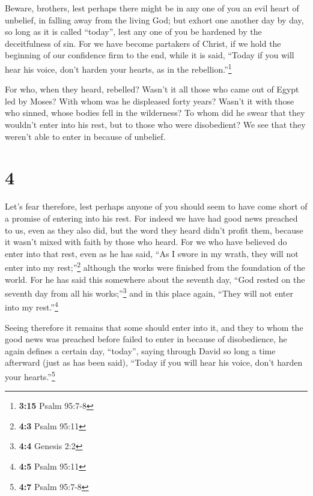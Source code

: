  Beware, brothers, lest perhaps there might be in any one
of you an evil heart of unbelief, in falling away from the living God;
 but exhort one another day by day, so long as it is
called ``today'', lest any one of you be hardened by the deceitfulness
of sin.  For we have become partakers of Christ, if we
hold the beginning of our confidence firm to the end, 
while it is said, ``Today if you will hear his voice, don't harden your
hearts, as in the rebellion.''\footnote{\textbf{3:15} Psalm 95:7-8}

 For who, when they heard, rebelled? Wasn't it all those
who came out of Egypt led by Moses?  With whom was he
displeased forty years? Wasn't it with those who sinned, whose bodies
fell in the wilderness?  To whom did he swear that they
wouldn't enter into his rest, but to those who were disobedient?
 We see that they weren't able to enter in because of
unbelief.

\hypertarget{section-3}{%
\section{4}\label{section-3}}

 Let's fear therefore, lest perhaps anyone of you should
seem to have come short of a promise of entering into his rest.
 For indeed we have had good news preached to us, even as
they also did, but the word they heard didn't profit them, because it
wasn't mixed with faith by those who heard.  For we who
have believed do enter into that rest, even as he has said, ``As I swore
in my wrath, they will not enter into my rest;''\footnote{\textbf{4:3}
  Psalm 95:11} although the works were finished from the foundation of
the world.  For he has said this somewhere about the
seventh day, ``God rested on the seventh day from all his
works;''\footnote{\textbf{4:4} Genesis 2:2}  and in this
place again, ``They will not enter into my rest.''\footnote{\textbf{4:5}
  Psalm 95:11}

 Seeing therefore it remains that some should enter into
it, and they to whom the good news was preached before failed to enter
in because of disobedience,  he again defines a certain
day, ``today'', saying through David so long a time afterward (just as
has been said), ``Today if you will hear his voice, don't harden your
hearts.''\footnote{\textbf{4:7} Psalm 95:7-8}

